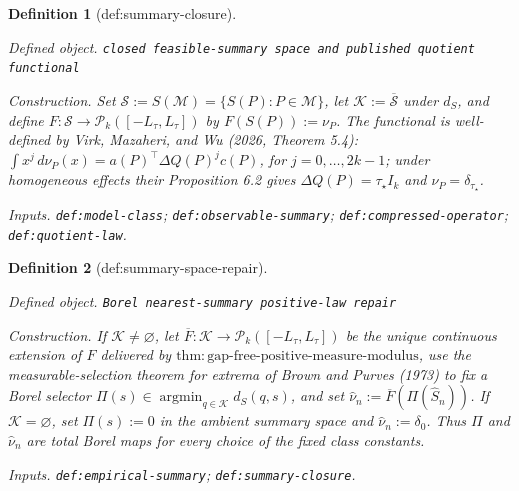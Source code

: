 \documentclass{article}
\newtheorem{definition}{Definition}
\begin{document}
\begin{definition}[def:summary-closure]\label{def:summary-closure}
\par\smallskip\noindent\emph{Defined object.} \texttt{closed feasible-\allowbreak{}summary space and published quotient functional}
\par\smallskip\noindent\emph{Construction.} Set \(\mathscr S:=S(\mathcal M)=\{S(P):P\in\mathcal M\}\), let \(\mathcal K:=\overline{\mathscr S}\) under \(d_S\), and define \(F:\mathscr S\to\mathcal P_k([-L_{\tau},L_{\tau}])\) by \(F(S(P)):=\nu_P\). The functional is well-defined by Virk, Mazaheri, and Wu (2026, Theorem 5.4): \(\int x^j\,d\nu_P(x)=a(P)^\top\Delta Q(P)^jc(P)\), for \(j=0,\ldots,2k-1\); under homogeneous effects their Proposition 6.2 gives \(\Delta Q(P)=\tau_\star I_k\) and \(\nu_P=\delta_{\tau_\star}\).
\par\smallskip\noindent\emph{Inputs.} \texttt{def:\allowbreak{}model-\allowbreak{}class}; \texttt{def:\allowbreak{}observable-\allowbreak{}summary}; \texttt{def:\allowbreak{}compressed-\allowbreak{}operator}; \texttt{def:\allowbreak{}quotient-\allowbreak{}law}.
\end{definition}

\begin{definition}[def:summary-space-repair]\label{def:summary-space-repair}
\par\smallskip\noindent\emph{Defined object.} \texttt{Borel nearest-\allowbreak{}summary positive-\allowbreak{}law repair}
\par\smallskip\noindent\emph{Construction.} If \(\mathcal K\ne\varnothing\), let \(\overline F:\mathcal K\to\mathcal P_k([-L_{\tau},L_{\tau}])\) be the unique continuous extension of \(F\) delivered by \(\mathrm{thm:gap\text{-}free\text{-}positive\text{-}measure\text{-}modulus}\), use the measurable-selection theorem for extrema of Brown and Purves (1973) to fix a Borel selector \(\Pi(s)\in\operatorname*{argmin}_{q\in\mathcal K}d_S(q,s)\), and set \(\widehat\nu_n:=\overline F(\Pi(\widehat S_n))\). If \(\mathcal K=\varnothing\), set \(\Pi(s):=0\) in the ambient summary space and \(\widehat\nu_n:=\delta_0\). Thus \(\Pi\) and \(\widehat\nu_n\) are total Borel maps for every choice of the fixed class constants.
\par\smallskip\noindent\emph{Inputs.} \texttt{def:\allowbreak{}empirical-\allowbreak{}summary}; \texttt{def:\allowbreak{}summary-\allowbreak{}closure}.
\end{definition}
\end{document}
